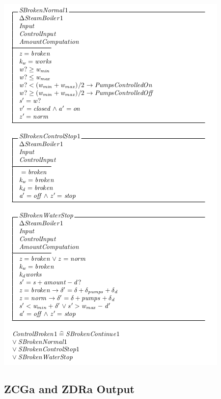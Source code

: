 \begin{center}
    \noindent \includegraphics[scale=0.8]{examples/steamboiler/0j.png}
\end{center}


\subsection{ZCGa and ZDRa Output}
\label{app:sb1n2o}

